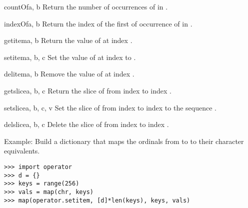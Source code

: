 \begin{funcdesc}{countOf}{a, b}
Return the number of occurrences of  in .
\end{funcdesc}

\begin{funcdesc}{indexOf}{a, b}
Return the index of the first of occurrence of  in .
\end{funcdesc}

\begin{funcdesc}{getitem}{a, b}
Return the value of  at index .
\end{funcdesc}

\begin{funcdesc}{setitem}{a, b, c}
Set the value of  at index  to .
\end{funcdesc}

\begin{funcdesc}{delitem}{a, b}
Remove the value of  at index .
\end{funcdesc}

\begin{funcdesc}{getslice}{a, b, c}
Return the slice of  from index  to index .
\end{funcdesc}

\begin{funcdesc}{setslice}{a, b, c, v}
Set the slice of  from index  to index  to the
sequence .
\end{funcdesc}

\begin{funcdesc}{delslice}{a, b, c}
Delete the slice of  from index  to index .
\end{funcdesc}


Example: Build a dictionary that maps the ordinals from  to
 to their character equivalents.

\begin{verbatim}
>>> import operator
>>> d = {}
>>> keys = range(256)
>>> vals = map(chr, keys)
>>> map(operator.setitem, [d]*len(keys), keys, vals)
\end{verbatim}
